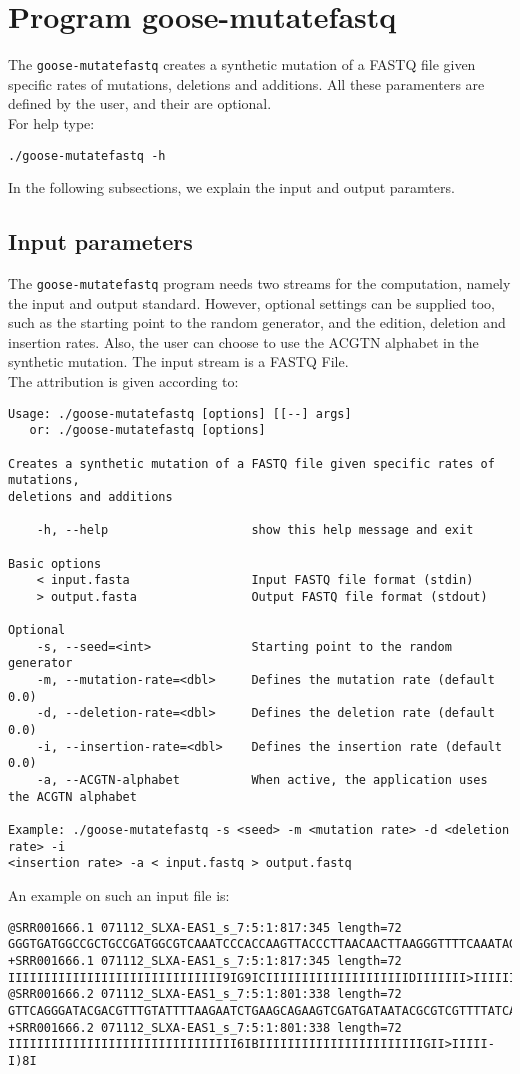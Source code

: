 \section{Program goose-mutatefastq}
The \texttt{goose-mutatefastq} creates a synthetic mutation of a FASTQ file given specific rates of mutations, deletions and additions. All these paramenters are defined by the user, and their are optional.\\
For help type:
\begin{lstlisting}
./goose-mutatefastq -h
\end{lstlisting}
In the following subsections, we explain the input and output paramters.

\subsection*{Input parameters}

The \texttt{goose-mutatefastq} program needs two streams for the computation, namely the input and output standard. However, optional settings can be supplied too, such as the starting point to the random generator, and the edition, deletion and insertion rates. Also, the user can choose to use the ACGTN alphabet in the synthetic mutation. The input stream is a FASTQ File.\\
The attribution is given according to:
\begin{lstlisting}
Usage: ./goose-mutatefastq [options] [[--] args]
   or: ./goose-mutatefastq [options]

Creates a synthetic mutation of a FASTQ file given specific rates of mutations,
deletions and additions

    -h, --help                    show this help message and exit

Basic options
    < input.fasta                 Input FASTQ file format (stdin)
    > output.fasta                Output FASTQ file format (stdout)

Optional
    -s, --seed=<int>              Starting point to the random generator
    -m, --mutation-rate=<dbl>     Defines the mutation rate (default 0.0)
    -d, --deletion-rate=<dbl>     Defines the deletion rate (default 0.0)
    -i, --insertion-rate=<dbl>    Defines the insertion rate (default 0.0)
    -a, --ACGTN-alphabet          When active, the application uses the ACGTN alphabet

Example: ./goose-mutatefastq -s <seed> -m <mutation rate> -d <deletion rate> -i 
<insertion rate> -a < input.fastq > output.fastq

\end{lstlisting}
An example on such an input file is:
\begin{lstlisting}
@SRR001666.1 071112_SLXA-EAS1_s_7:5:1:817:345 length=72
GGGTGATGGCCGCTGCCGATGGCGTCAAATCCCACCAAGTTACCCTTAACAACTTAAGGGTTTTCAAATAGA
+SRR001666.1 071112_SLXA-EAS1_s_7:5:1:817:345 length=72
IIIIIIIIIIIIIIIIIIIIIIIIIIIIII9IG9ICIIIIIIIIIIIIIIIIIIIIDIIIIIII>IIIIII/
@SRR001666.2 071112_SLXA-EAS1_s_7:5:1:801:338 length=72
GTTCAGGGATACGACGTTTGTATTTTAAGAATCTGAAGCAGAAGTCGATGATAATACGCGTCGTTTTATCAT
+SRR001666.2 071112_SLXA-EAS1_s_7:5:1:801:338 length=72
IIIIIIIIIIIIIIIIIIIIIIIIIIIIIIII6IBIIIIIIIIIIIIIIIIIIIIIIIGII>IIIII-I)8I
\end{lstlisting}

